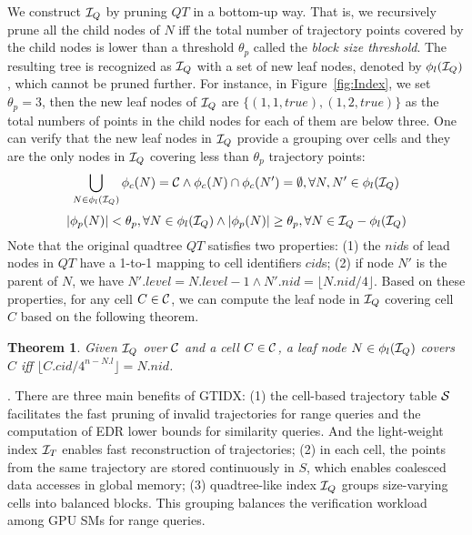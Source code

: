 \documentclass[10pt,conference,letterpaper]{IEEEtran}
\newcommand{\idxname}{GTIDX\xspace }
\newcommand{\allcell}{{\cal C}\xspace}
\newcommand{\trajtable}{{\cal S}\xspace}
\newcommand{\trajindex}{{{\cal I}_T}\xspace}
\newcommand{\treeindex}{{{\cal I}_Q}\xspace}
\newtheorem{theorem}{Theorem}
\begin{document}
We construct $\treeindex$ by pruning $QT$ in a bottom-up way. That is, we recursively prune all the child nodes of $N$ iff the total number of trajectory points covered by the child nodes is lower than a threshold $\theta_p$ called the \emph{block size threshold}. The resulting tree is recognized as $\treeindex$ with a set of new leaf nodes, denoted by $\phi_l(\treeindex)$, which cannot be pruned further. For instance, in Figure~\ref{fig:Index}, we set $\theta_p=3$, then the new leaf nodes of $\treeindex$ are $\{(1,1,true),(1,2,true)\}$ as the total numbers of points in the child nodes for each of them are below three. One can verify that the new leaf nodes in $\treeindex$ provide a grouping over cells and they are the only nodes in $\treeindex$ covering less than $\theta_p$ trajectory points:
\begin{equation}\label{eq:cond1}
\small
\bigcup_{N\in\phi_l(\treeindex)} {\phi_c(N)}= \allcell  \wedge \phi_c(N)\cap \phi_c(N') = \emptyset, \forall N, N'\in\phi_l(\treeindex)
\end{equation}
\begin{equation}\label{eq:cond2}
\small
|\phi_p(N)| < \theta_p, \forall N\in\phi_l(\treeindex) \wedge
|\phi_p(N)| \geq \theta_p, \forall N\in \treeindex-\phi_l(\treeindex)
\end{equation}
%
Note that the original quadtree $QT$ satisfies two properties: (1) the $nid$s of lead nodes in $QT$ have a 1-to-1 mapping to cell identifiers $cid$s; (2) if node $N'$ is the parent of $N$, we have $N'.level = N.level-1 \wedge N'.nid =  \lfloor N.nid/4 \rfloor$.
Based on these properties, for any cell $C\in\allcell$, we can compute the leaf node in $\treeindex$ covering cell $C$ based on the following theorem.
%
\begin{theorem}\label{le:findleaf}
	Given $\treeindex$ over $\allcell$ and a cell $C\in\allcell$, a leaf node $N\in \phi_l(\treeindex)$ covers $C$ iff $\lfloor C.cid/4^{n-N.l}\rfloor = N.nid$.	
\end{theorem}




\vspace{0.1cm}{\bf Benefits of \idxname}.
There are three main benefits of \idxname:
%
(1) the cell-based trajectory table $\trajtable$ facilitates the fast pruning of invalid trajectories for range queries and the computation of EDR lower bounds for similarity queries. And the light-weight index $\trajindex$ enables fast reconstruction of trajectories;
(2) in each cell, the points from the same trajectory are stored continuously in $S$, which enables coalesced data accesses in global memory;
(3) quadtree-like index $\treeindex$ groups size-varying cells into balanced blocks. This grouping balances the verification workload among GPU SMs for range queries.
\end{document}
